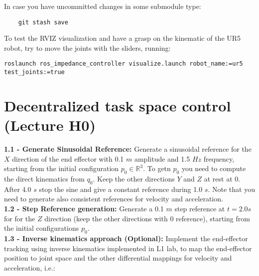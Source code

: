 \documentclass[11pt]{article}
\newcommand{\Rnum}{\mathbb{R}} %
\begin{document}
In case you have uncommitted changes in some submodule type: 

\begin{verbatim}
	git stash save
\end{verbatim}


%
%

To test the RVIZ visualization and have a grasp on the kinematic of the UR5 robot, try to move the joints with the sliders, running:
%
\begin{verbatim}
roslaunch ros_impedance_controller visualize.launch robot_name:=ur5 test_joints:=true 
\end{verbatim}

\section{Decentralized task space control (Lecture H0)}


\textbf{1.1 - Generate Sinusoidal Reference:}
Generate a sinusoidal reference for the $X$ direction of the end effector with 0.1 $m$  amplitude and 1.5 $Hz$ frequency, starting from the initial configuration $p_0 \in \Rnum^3$. 
To getn $p_0$ you need to compute the direct kinematics from $q_0$. Keep the other directions $Y$ and $Z$ at rest at 0. After 4.0 $s$ stop the sine and give a constant reference during 1.0 $s$. Note that you need to generate also consistent references for velocity and acceleration.\\



\textbf{1.2 - Step Reference generation:}
Generate a 0.1 $m$  step reference at $t= 2.0s$ for  for the $Z$ direction
 (keep the other directions with 0 reference), starting from the initial configurations $p_0$.\\


\textbf{1.3 - Inverse kinematics approach (Optional):}  Implement the end-effector tracking using inverse kinematics implemented in L1 lab, to map the end-effector position to joint space and the other differential mappings for velocity and acceleration, i.e.:
\end{document}
